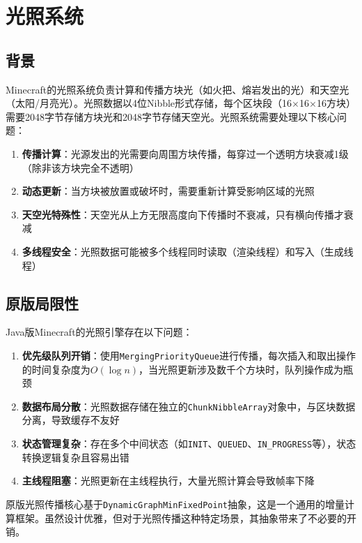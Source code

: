 \section{光照系统}
\label{sec:lighting}

\subsection{背景}

Minecraft的光照系统负责计算和传播方块光（如火把、熔岩发出的光）和天空光（太阳/月亮光）。光照数据以4位Nibble形式存储，每个区块段（16$\times$16$\times$16方块）需要2048字节存储方块光和2048字节存储天空光。光照系统需要处理以下核心问题：

\begin{enumerate}
    \item \textbf{传播计算}：光源发出的光需要向周围方块传播，每穿过一个透明方块衰减1级（除非该方块完全不透明）
    \item \textbf{动态更新}：当方块被放置或破坏时，需要重新计算受影响区域的光照
    \item \textbf{天空光特殊性}：天空光从上方无限高度向下传播时不衰减，只有横向传播才衰减
    \item \textbf{多线程安全}：光照数据可能被多个线程同时读取（渲染线程）和写入（生成线程）
\end{enumerate}

\subsection{原版局限性}

Java版Minecraft的光照引擎存在以下问题：

\begin{enumerate}
    \item \textbf{优先级队列开销}：使用\texttt{MergingPriorityQueue}进行传播，每次插入和取出操作的时间复杂度为$O(\log n)$，当光照更新涉及数千个方块时，队列操作成为瓶颈
    \item \textbf{数据布局分散}：光照数据存储在独立的\texttt{ChunkNibbleArray}对象中，与区块数据分离，导致缓存不友好
    \item \textbf{状态管理复杂}：存在多个中间状态（如\texttt{INIT}、\texttt{QUEUED}、\texttt{IN\_PROGRESS}等），状态转换逻辑复杂且容易出错
    \item \textbf{主线程阻塞}：光照更新在主线程执行，大量光照计算会导致帧率下降
\end{enumerate}

原版光照传播核心基于\texttt{DynamicGraphMinFixedPoint}抽象，这是一个通用的增量计算框架。虽然设计优雅，但对于光照传播这种特定场景，其抽象带来了不必要的开销。

